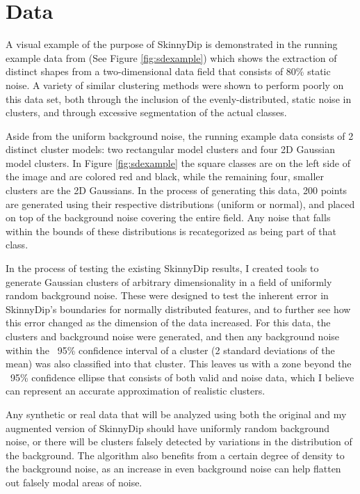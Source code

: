 \documentclass{sig-alternate-05-2015}
\begin{document}
\section{Data} \label{data}
A visual example of the purpose of SkinnyDip is demonstrated in the running example data from \cite{skinnydip} (See Figure \ref{fig:sdexample}) which shows the extraction of distinct shapes from a two-dimensional data field that consists of 80\% static noise. A variety of similar clustering methods were shown to perform poorly on this data set, both through the inclusion of the evenly-distributed, static noise in clusters, and through excessive segmentation of the actual classes.

Aside from the uniform background noise, the running example data consists of 2 distinct cluster models: two rectangular model clusters and four 2D Gaussian model clusters. In Figure \ref{fig:sdexample} the square classes are on the left side of the image and are colored red and black, while the remaining four, smaller clusters are the 2D Gaussians. In the process of generating this data, 200 points are generated using their respective distributions (uniform or normal), and placed on top of the background noise covering the entire field. Any noise that falls within the bounds of these distributions is recategorized as being part of that class.

In the process of testing the existing SkinnyDip results, I created tools to generate Gaussian clusters of arbitrary dimensionality in a field of uniformly random background noise. These were designed to test the inherent error in SkinnyDip's boundaries for normally distributed features, and to further see how this error changed as the dimension of the data increased. For this data, the clusters and background noise were generated, and then any background noise within the ~95\% confidence interval of a cluster (2 standard deviations of the mean) was also classified into that cluster. This leaves us with a zone beyond the ~95\% confidence ellipse that consists of both valid and noise data, which I believe can represent an accurate approximation of realistic clusters.

Any synthetic or real data that will be analyzed using both the original and my augmented version of SkinnyDip should have uniformly random background noise, or there will be clusters falsely detected by variations in the distribution of the background. The algorithm also benefits from a certain degree of density to the background noise, as an increase in even background noise can help flatten out falsely modal areas of noise.
\end{document}
